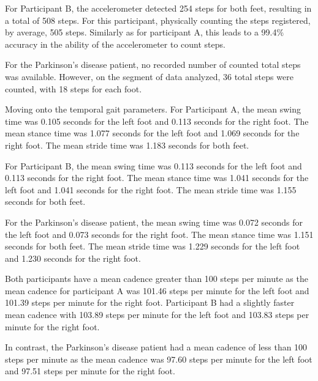 For Participant B, the accelerometer detected 254 steps for both feet, resulting in a total of 508 steps. For this participant, physically counting the steps registered, by average, 505 steps. Similarly as for participant A, this leads to a 99.4\% accuracy in the ability of the accelerometer to count steps.

For the Parkinson's disease patient, no recorded number of counted total steps was available. However, on the segment of data analyzed, 36 total steps were counted, with 18 steps for each foot.

Moving onto the temporal gait parameters. For Participant A, the mean swing time was 0.105 seconds for the left foot and 0.113 seconds for the right foot. The mean stance time was 1.077 seconds for the left foot and 1.069 seconds for the right foot. The mean stride time was 1.183 seconds for both feet.

For Participant B, the mean swing time was 0.113 seconds for the left foot and 0.113 seconds for the right foot. The mean stance time was 1.041 seconds for the left foot and 1.041 seconds for the right foot. The mean stride time was 1.155 seconds for both feet.

For the Parkinson's disease patient, the mean swing time was 0.072 seconds for the left foot and 0.073 seconds for the right foot. The mean stance time was 1.151 seconds for both feet. The mean stride time was 1.229 seconds for the left foot and 1.230 seconds for the right foot.

Both participants have a mean cadence greater than 100 steps per minute as the mean cadence for participant A was 101.46 steps per minute for the left foot and 101.39 steps per minute for the right foot. Participant B had a slightly faster mean cadence with 103.89 steps per minute for the left foot and 103.83 steps per minute for the right foot.

In contrast, the Parkinson's disease patient had a mean cadence of less than 100 steps per minute as the mean cadence was 97.60 steps per minute for the left foot and 97.51 steps per minute for the right foot.


